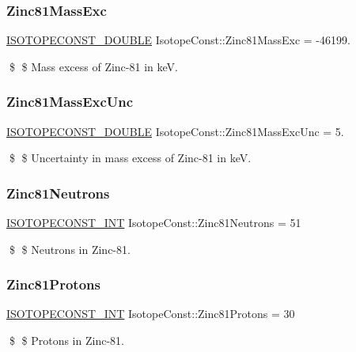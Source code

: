 \subsubsection{\texorpdfstring{Zinc81\+Mass\+Exc}{Zinc81MassExc}}
{\footnotesize\ttfamily \mbox{\hyperlink{group___isotope_const-_macros_ga8f45a7272ce02c0b4c65c44636ed719a}{I\+S\+O\+T\+O\+P\+E\+C\+O\+N\+S\+T\+\_\+\+D\+O\+U\+B\+LE}} Isotope\+Const\+::\+Zinc81\+Mass\+Exc = -\/46199.}

\$ \$ Mass excess of Zinc-\/81 in keV. \mbox{\label{group___isotope_const-_zinc-_zn81_ga0fc68955515a4962e7640da482710b6f}} 
\subsubsection{\texorpdfstring{Zinc81\+Mass\+Exc\+Unc}{Zinc81MassExcUnc}}
{\footnotesize\ttfamily \mbox{\hyperlink{group___isotope_const-_macros_ga8f45a7272ce02c0b4c65c44636ed719a}{I\+S\+O\+T\+O\+P\+E\+C\+O\+N\+S\+T\+\_\+\+D\+O\+U\+B\+LE}} Isotope\+Const\+::\+Zinc81\+Mass\+Exc\+Unc = 5.}

\$ \$ Uncertainty in mass excess of Zinc-\/81 in keV. \mbox{\label{group___isotope_const-_zinc-_zn81_ga1c6ba9c6c97e793de2823c8c44f0f5b6}} 
\subsubsection{\texorpdfstring{Zinc81\+Neutrons}{Zinc81Neutrons}}
{\footnotesize\ttfamily \mbox{\hyperlink{group___isotope_const-_macros_ga5f18360b3e99483a35c32d789e62621c}{I\+S\+O\+T\+O\+P\+E\+C\+O\+N\+S\+T\+\_\+\+I\+NT}} Isotope\+Const\+::\+Zinc81\+Neutrons = 51}

\$ \$ Neutrons in Zinc-\/81. \mbox{\label{group___isotope_const-_zinc-_zn81_ga5b841cf8e40a82777e92e7438ec37a4c}} 
\subsubsection{\texorpdfstring{Zinc81\+Protons}{Zinc81Protons}}
{\footnotesize\ttfamily \mbox{\hyperlink{group___isotope_const-_macros_ga5f18360b3e99483a35c32d789e62621c}{I\+S\+O\+T\+O\+P\+E\+C\+O\+N\+S\+T\+\_\+\+I\+NT}} Isotope\+Const\+::\+Zinc81\+Protons = 30}

\$ \$ Protons in Zinc-\/81. 